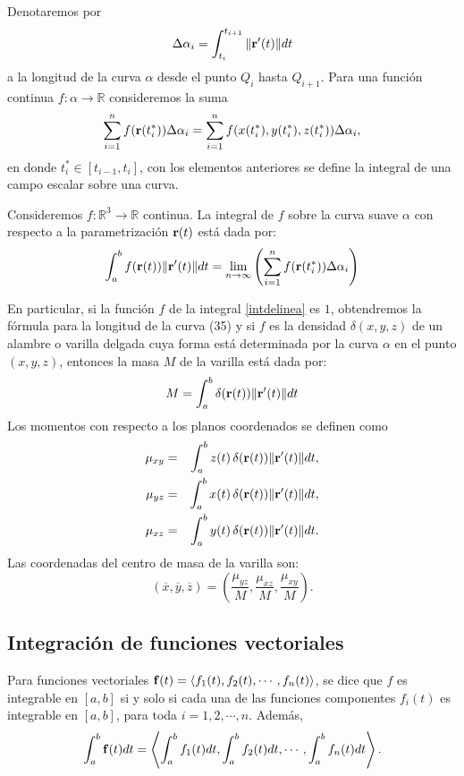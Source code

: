 Denotaremos por \[\Delta\alpha_i=\int_{t_i}^{t_{i+1}}\Vert {\bf r}^\prime(t)\Vert dt \]
a la longitud de la curva $\alpha$ desde el punto $Q_i$ hasta $Q_{i+1}$.
Para una función continua $f: \alpha \to \mathbb{R}$ consideremos la suma
\[\sum_{i=1}^n f({\bf r}(t_i^*))\Delta \alpha_i=\sum_{i=1}^n f(x(t_i^*),y(t_i^*),z(t_i^*))\Delta \alpha_{i},\]
en donde $t_i^* \in [t_{i-1},t_i]$, con los elementos anteriores se define la integral de una campo escalar sobre una curva.
\begin{defi}
Consideremos $f:\mathbb{R}^3\to \mathbb{R}$ continua.
La integral de $f$ sobre la curva suave $\alpha$ con respecto a la parametrización
${\bf r}(t)$ está dada por:
\begin{equation} \label{intdelinea}
\int_a^b f({\bf r}(t))\Vert{\bf r}^\prime(t)\Vert dt=\lim_{n\to\infty}\left(\sum_{i=1}^n f({\bf r}(t_i^*))\Delta \alpha_i\right)
\end{equation} 
\end{defi}
En particular, si la función $f$ de la integral \ref{intdelinea} es $1$, obtendremos la fórmula para la longitud de la
curva (35) y si $f$ es la densidad $\delta(x,y,z)$ de un alambre o varilla delgada cuya forma está determinada por la curva $\alpha$ en el punto $(x,y,z)$, entonces la masa $M$ de la varilla está dada por:
\begin{equation}
M=\int_a^b \delta({\bf r}(t))\Vert{\bf r}^\prime(t)\Vert dt
\end{equation}
Los momentos con respecto a los planos coordenados se definen como
\begin{eqnarray*}
\mu_{xy}&=&\int_a^b z(t)\,\delta({\bf r}(t))\Vert{\bf r}^\prime(t)\Vert dt,\\
\mu_{yz}&=&\int_a^b x(t)\,\delta({\bf r}(t))\Vert{\bf r}^\prime(t)\Vert dt,\\
\mu_{xz}&=&\int_a^b y(t)\,\delta({\bf r}(t))\Vert{\bf r}^\prime(t)\Vert dt.
\end{eqnarray*}
Las coordenadas del centro de masa de la varilla son:
\[(\overline{x},\overline{y},\overline{z})= \left(\frac{\mu_{yz}}{M},\frac{\mu_{xz}}{M},\frac{\mu_{xy}}{M}\right).\]

\subsection{Integración de funciones vectoriales} 
Para funciones vectoriales ${\bf f}(t)=\langle f_1(t),f_2(t),\cdots,f_n(t)\rangle$, se dice que $f$ es integrable en $[a,b]$
si y solo si cada una de las funciones componentes $f_i(t)$ es integrable en $[a,b]$, para toda $i=1,2,\cdots ,n$.
Además, \[\int_a^b{\bf f}(t)dt= \left\langle \int_a^b f_1(t)dt,\int_a^b f_2(t)dt,\cdots, \int_a^b f_n(t)dt\right\rangle.\]

